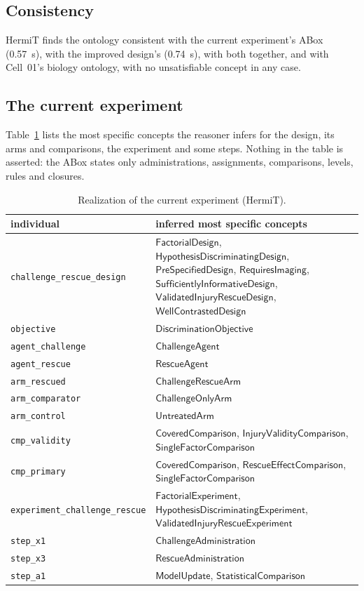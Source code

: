\documentclass[10pt,a4paper]{article}
\begin{document}
\subsection{Consistency}
HermiT finds the ontology consistent with the current experiment's ABox (0.57~s), with the improved design's
(0.74~s), with both together, and with Cell~01's biology ontology, with no unsatisfiable concept in any case.
\subsection{The current experiment}
Table~\ref{tab:real1} lists the most specific concepts the reasoner infers for the design, its arms and comparisons,
the experiment and some steps. Nothing in the table is asserted: the ABox states only administrations, assignments,
comparisons, levels, rules and closures.

\begin{table}[tbp]\centering\footnotesize
\caption{Realization of the current experiment (HermiT).}\label{tab:real1}
\begin{tabularx}{\linewidth}{@{}p{5.0cm}X@{}}\toprule individual & inferred most specific concepts \\ \midrule
\texttt{challenge\_\allowbreak{}rescue\_\allowbreak{}design} & $\mathsf{FactorialDesign}$, $\mathsf{HypothesisDiscriminatingDesign}$, $\mathsf{PreSpecifiedDesign}$, $\mathsf{RequiresImaging}$, $\mathsf{SufficientlyInformativeDesign}$, $\mathsf{ValidatedInjuryRescueDesign}$, $\mathsf{WellContrastedDesign}$ \\
\texttt{objective} & $\mathsf{DiscriminationObjective}$ \\
\texttt{agent\_\allowbreak{}challenge} & $\mathsf{ChallengeAgent}$ \\
\texttt{agent\_\allowbreak{}rescue} & $\mathsf{RescueAgent}$ \\
\texttt{arm\_\allowbreak{}rescued} & $\mathsf{ChallengeRescueArm}$ \\
\texttt{arm\_\allowbreak{}comparator} & $\mathsf{ChallengeOnlyArm}$ \\
\texttt{arm\_\allowbreak{}control} & $\mathsf{UntreatedArm}$ \\
\texttt{cmp\_\allowbreak{}validity} & $\mathsf{CoveredComparison}$, $\mathsf{InjuryValidityComparison}$, $\mathsf{SingleFactorComparison}$ \\
\texttt{cmp\_\allowbreak{}primary} & $\mathsf{CoveredComparison}$, $\mathsf{RescueEffectComparison}$, $\mathsf{SingleFactorComparison}$ \\
\texttt{experiment\_\allowbreak{}challenge\_\allowbreak{}rescue} & $\mathsf{FactorialExperiment}$, $\mathsf{HypothesisDiscriminatingExperiment}$, $\mathsf{ValidatedInjuryRescueExperiment}$ \\
\texttt{step\_\allowbreak{}x1} & $\mathsf{ChallengeAdministration}$ \\
\texttt{step\_\allowbreak{}x3} & $\mathsf{RescueAdministration}$ \\
\texttt{step\_\allowbreak{}a1} & $\mathsf{ModelUpdate}$, $\mathsf{StatisticalComparison}$ \\
\bottomrule\end{tabularx}\end{table}
\end{document}
